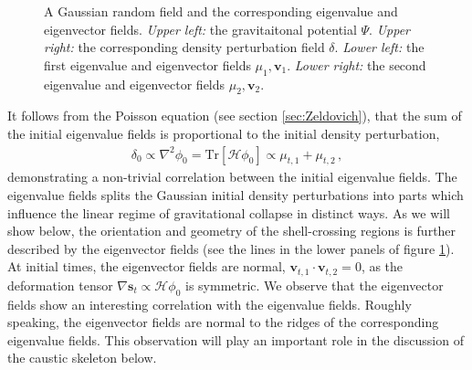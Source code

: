 \documentclass[a4paper, 11pt]{article}
\begin{document}
\begin{figure}
\begin{subfigure}[b]{0.49\textwidth}
\end{subfigure}
\caption{A Gaussian random field and the corresponding eigenvalue and eigenvector fields. \textit{Upper left:} the gravitaitonal potential $\Psi$. \textit{Upper right:} the corresponding density perturbation field $\delta$. \textit{Lower left:} the first eigenvalue and eigenvector fields $\mu_1,\bm{v}_1$. \textit{Lower right:} the second eigenvalue and eigenvector fields $\mu_2,\bm{v}_2$.}\label{fig:Initial_Conditions}
\end{figure}


It follows from the Poisson equation (see section \ref{sec:Zeldovich}), that the sum of the initial eigenvalue fields is proportional to the initial density perturbation, 
\begin{align}
\delta_0 \propto \nabla^2 \phi_0 = \text{Tr}[\mathcal{H}\phi_0] \propto \mu_{t,1} + \mu_{t,2}\,,
\end{align}
demonstrating a non-trivial correlation between the initial eigenvalue fields. The eigenvalue fields splits the Gaussian initial density perturbations into parts which influence the linear regime of gravitational collapse in distinct ways. As we will show below, the orientation and geometry of the shell-crossing regions is further described by the eigenvector fields (see the lines in the lower panels of figure \ref{fig:Initial_Conditions}). At initial times, the eigenvector fields are normal, $\bm{v}_{t,1}\cdot \bm{v}_{t,2}=0$, as the deformation tensor $\nabla \bm{s}_t \propto \mathcal{H} \phi_0$ is symmetric. We observe that the eigenvector fields show an interesting correlation with the eigenvalue fields. Roughly speaking, the eigenvector fields are normal to the ridges of the corresponding eigenvalue fields. This observation will play an important role in the discussion of the caustic skeleton below. 

\end{document}
